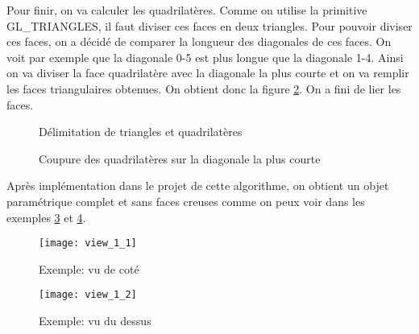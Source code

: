 \documentclass[article, backcover, french, nodocumentinfo]{upmethodology-document}
\begin{document}
		Pour finir, on va calculer les quadrilatères. Comme on utilise la primitive GL\_TRIANGLES, il faut diviser ces faces en deux triangles. Pour pouvoir diviser ces faces, on a décidé de comparer la longueur des diagonales de ces faces. On voit par exemple que la diagonale 0-5 est plus longue que la diagonale 1-4. Ainsi on va diviser la face quadrilatère avec la diagonale la plus courte et on va remplir les faces triangulaires obtenues. On obtient donc la figure \ref{fig:layers_4_quadrilaterals_diagonals}. On a fini de lier les faces.
		\par\noindent\begin{minipage}[t]{\textwidth}
			\centering
			\begin{minipage}[t]{0.49\textwidth}
				\begin{figure}[H]
					\centering%
					\caption{Délimitation de triangles et quadrilatères}
					\label{fig:layers_3_triangles_quadrilaterals}%
				\end{figure}
			\end{minipage}
			\begin{minipage}[t]{0.49\textwidth}
				\begin{figure}[H]
					\centering%
					\caption{Coupure des quadrilatères sur la diagonale la plus courte}%
					\label{fig:layers_4_quadrilaterals_diagonals}%
				\end{figure}
			\end{minipage}
		\end{minipage}
		
		Après implémentation dans le projet de cette algorithme, on obtient un objet paramétrique complet et sans faces creuses comme on peux voir dans les exemples \ref{fig:view_1_1} et \ref{fig:view_1_2}.
		\par\noindent\begin{minipage}[t]{\textwidth}
			\centering
			\begin{minipage}[t]{0.49\textwidth}
				\begin{figure}[H]
					\centering%
					\texttt{[image: view\_1\_1]}%
					\caption{Exemple: vu de coté}%
					\label{fig:view_1_1}%
				\end{figure}
			\end{minipage}
			\begin{minipage}[t]{0.49\textwidth}
				\begin{figure}[H]
					\centering%
					\texttt{[image: view\_1\_2]}%
					\caption{Exemple: vu du dessus}%
					\label{fig:view_1_2}%
				\end{figure}
			\end{minipage}
		\end{minipage}
\end{document}
